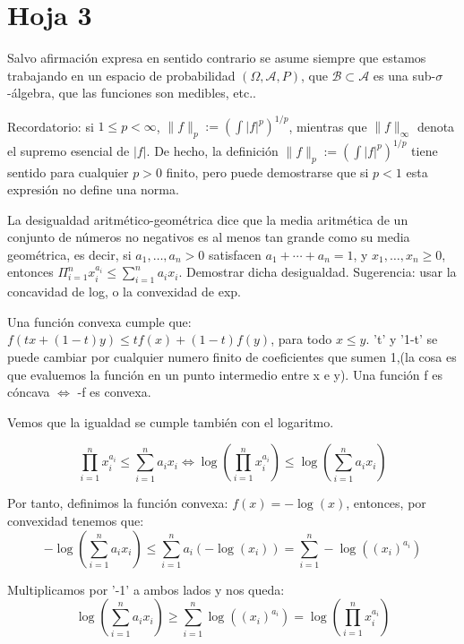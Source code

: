 

\newpage
\section{Hoja 3}

Salvo afirmaci\'on expresa en sentido
contrario se asume siempre que estamos trabajando en un espacio de probabilidad $(\Omega, \mathcal{A}, P)$,
que  $\mathcal{B}\subset \mathcal{A}$ es una sub-$\sigma$-\'algebra, que las funciones son medibles, etc..

Recordatorio: si $1\le p < \infty$, $\|f\|_p := \left(\int|f|^p\right)^{1/p}$, mientras que
$\|f\|_\infty$ denota el supremo esencial de $|f|$. De hecho, la definici\'on
 $\|f\|_p := \left(\int|f|^p\right)^{1/p}$ tiene sentido para cualquier $p > 0$ finito, pero puede demostrarse que si $p < 1$ esta expresi\'on no define una norma.


\begin{problem}[1] La desigualdad aritm\'etico-geom\'etrica 
dice que la media  aritm\'etica de un conjunto de n\'umeros no negativos es al menos tan grande
como su media  geom\'etrica, es decir, si $a_1, \dots ,a_n > 0$ satisfacen  $a_1 + \cdots  + a_n = 1$,  y  
 $x_1, \dots ,x_n \ge 0$, entonces $\Pi_{i=1}^n x_i^{a_i} \le \sum_{i=1}^n a_i x_i$.
Demostrar dicha desigualdad. Sugerencia: usar la concavidad
de log, o la convexidad de exp.
\solution

\begin{expla}
Una función convexa cumple que: $f(tx+(1-t)y) \leq tf(x)+(1-t)f(y)$, para todo $x\leq y$. 't' y '1-t' se puede cambiar por cualquier numero finito de coeficientes que sumen 1,(la cosa es que evaluemos la función en un punto intermedio entre x e y).
Una función f es cóncava $\Leftrightarrow$ -f es convexa.
\end{expla}
Vemos que la igualdad se cumple también con el logaritmo.

\[
\prod_{i=1}^n x_i^{a_i} \leq \sum_{i=1}^{n}a_i x_i \Leftrightarrow \log\left(\prod_{i=1}^n x_i^{a_i}\right) \leq \log \left(\sum_{i=1}^{n}a_i x_i\right)
\]

Por tanto, definimos la función convexa: $f(x) = -\log(x)$, entonces, por convexidad tenemos que:
\[
-\log \left(\sum_{i=1}^{n}a_i x_i\right) \leq \sum_{i=1}^{n} a_i\left(-\log(x_i)\right) = \sum_{i=1}^{n} -\log\left((x_i)^{a_i}\right) 
\]
 
Multiplicamos por '-1' a ambos lados y nos queda:
\[
\log \left(\sum_{i=1}^{n}a_i x_i\right) \geq \sum_{i=1}^{n} \log\left((x_i)^{a_i}\right) = \log\left(\prod_{i=1}^n x_i^{a_i}\right) 
\]


\end{problem}



